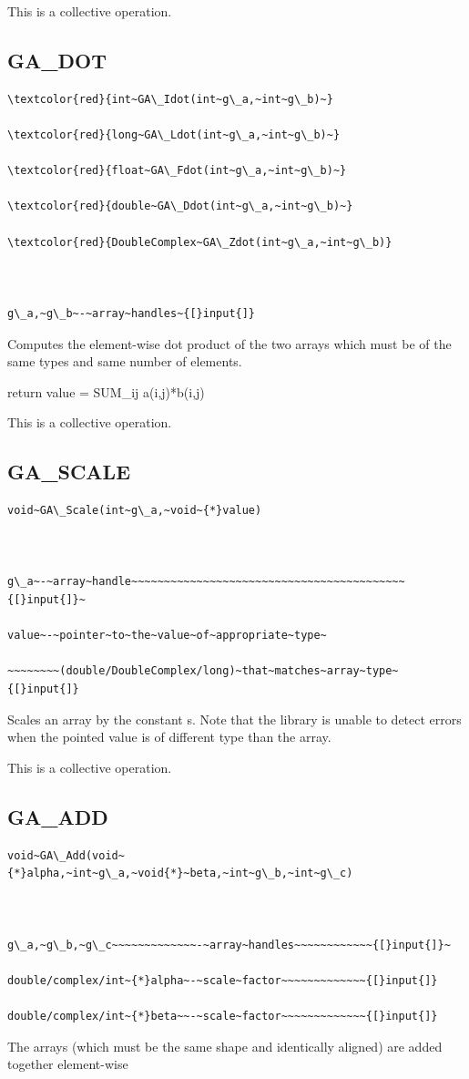 This is a collective operation. 


\subsection*{\label{sub:GA_DOT}GA\_DOT}
\begin{verbatim}
\textcolor{red}{int~GA\_Idot(int~g\_a,~int~g\_b)~}

\textcolor{red}{long~GA\_Ldot(int~g\_a,~int~g\_b)~}

\textcolor{red}{float~GA\_Fdot(int~g\_a,~int~g\_b)~}

\textcolor{red}{double~GA\_Ddot(int~g\_a,~int~g\_b)~}

\textcolor{red}{DoubleComplex~GA\_Zdot(int~g\_a,~int~g\_b)}



g\_a,~g\_b~-~array~handles~{[}input{]}
\end{verbatim}
Computes the element-wise dot product of the two arrays which must
be of the same types and same number of elements.

return value = SUM\_ij a(i,j){*}b(i,j)

This is a collective operation. 


\subsection*{\label{sub:GA_SCALE}GA\_SCALE}
\begin{verbatim}
void~GA\_Scale(int~g\_a,~void~{*}value)



g\_a~-~array~handle~~~~~~~~~~~~~~~~~~~~~~~~~~~~~~~~~~~~~~~~~~{[}input{]}~

value~-~pointer~to~the~value~of~appropriate~type~

~~~~~~~~(double/DoubleComplex/long)~that~matches~array~type~{[}input{]}
\end{verbatim}
Scales an array by the constant s. Note that the library is unable
to detect errors when the pointed value is of different type than
the array.

This is a collective operation. 


\subsection*{\label{sub:GA_ADD}GA\_ADD}
\begin{verbatim}
void~GA\_Add(void~{*}alpha,~int~g\_a,~void{*}~beta,~int~g\_b,~int~g\_c)



g\_a,~g\_b,~g\_c~~~~~~~~~~~~~-~array~handles~~~~~~~~~~~~{[}input{]}~

double/complex/int~{*}alpha~-~scale~factor~~~~~~~~~~~~~{[}input{]}

double/complex/int~{*}beta~~-~scale~factor~~~~~~~~~~~~~{[}input{]}
\end{verbatim}
The arrays (which must be the same shape and identically aligned)
are added together element-wise


